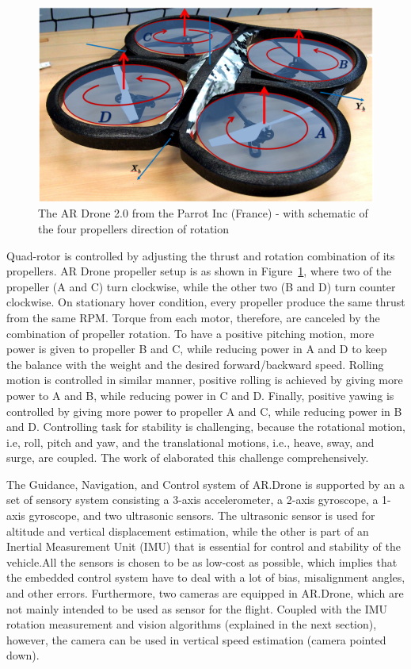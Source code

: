 \begin{figure}
\includegraphics[width=1\linewidth]{Figures/TheDrone.png}
\centering
\caption{The AR Drone 2.0 from the Parrot Inc (France) - with schematic of the four propellers direction of rotation}
\label{f:TheDrone}
\end{figure}

Quad-rotor is controlled by adjusting the thrust and rotation combination of its propellers. AR Drone propeller setup is as shown in Figure~\ref{f:TheDrone}, where two of the propeller (A and C) turn clockwise, while the other two (B and D) turn counter clockwise. On stationary hover condition, every propeller produce the same thrust from the same RPM. Torque from each motor, therefore, are canceled by the combination of propeller rotation. To have a positive pitching motion, more power is given to propeller B and C, while reducing power in A and D to keep the balance with the weight and the desired forward/backward speed. Rolling motion is controlled in similar manner, positive rolling is achieved by giving more power to A and B, while reducing power in C and D. Finally, positive yawing is controlled by giving more power to propeller A and C, while reducing power in B and D. Controlling task for stability is challenging, because the rotational motion, i.e, roll, pitch and yaw, and the translational motions, i.e., heave, sway, and surge, are coupled. The work of \cite{Bouabdallah:07} elaborated this challenge comprehensively.

The Guidance, Navigation, and Control system of AR.Drone is supported by an a set of sensory system consisting a 3-axis accelerometer, a 2-axis gyroscope, a 1-axis gyroscope, and two ultrasonic sensors. The ultrasonic sensor is used for altitude and vertical displacement estimation, while the other is part of an Inertial Measurement Unit (IMU) that is essential for control and stability of the vehicle.All the sensors is chosen to be as low-cost as possible, which implies that the embedded control system have to deal with a lot of bias, misalignment angles, and other errors\cite{Bristeau:11}. Furthermore, two cameras are equipped in AR.Drone, which are not mainly intended to be used as sensor for the flight. Coupled with the IMU rotation measurement and vision algorithms (explained in the next section), however, the camera can be used in vertical speed estimation (camera pointed down). 

